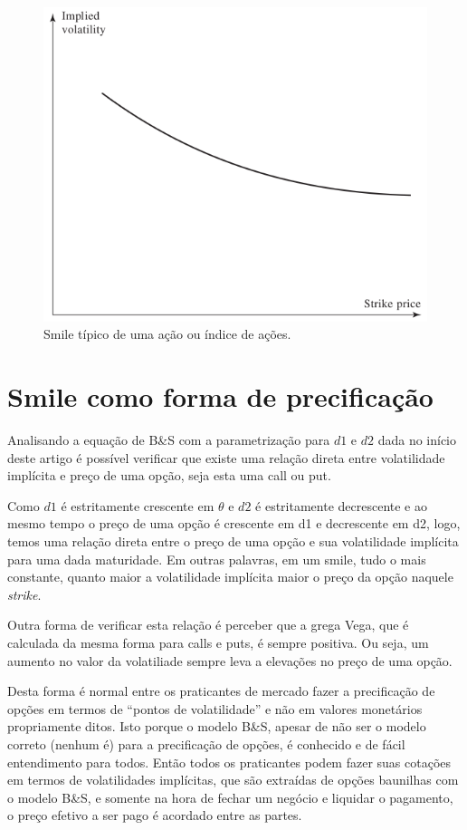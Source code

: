 \documentclass[]{book}
\begin{document}
\begin{figure}
\centering
\includegraphics{./images/smile_equities.png}
\caption{\label{fig:smile-equities}Smile típico de uma ação ou índice de
ações.}
\end{figure}

\section{Smile como forma de precificação}\label{smileprecificacao}

Analisando a equação de B\&S com a parametrização para \(d1\) e \(d2\)
dada no início deste artigo é possível verificar que existe uma relação
direta entre volatilidade implícita e preço de uma opção, seja esta uma
call ou put.

Como \(d1\) é estritamente crescente em \(\theta\) e \(d2\) é
estritamente decrescente e ao mesmo tempo o preço de uma opção é
crescente em d1 e decrescente em d2, logo, temos uma relação direta
entre o preço de uma opção e sua volatilidade implícita para uma dada
maturidade. Em outras palavras, em um smile, tudo o mais constante,
quanto maior a volatilidade implícita maior o preço da opção naquele
\emph{strike}.

Outra forma de verificar esta relação é perceber que a grega Vega, que é
calculada da mesma forma para calls e puts, é sempre positiva. Ou seja,
um aumento no valor da volatiliade sempre leva a elevações no preço de
uma opção.

Desta forma é normal entre os praticantes de mercado fazer a
precificação de opções em termos de ``pontos de volatilidade'' e não em
valores monetários propriamente ditos. Isto porque o modelo B\&S, apesar
de não ser o modelo correto (nenhum é) para a precificação de opções, é
conhecido e de fácil entendimento para todos. Então todos os praticantes
podem fazer suas cotações em termos de volatilidades implícitas, que são
extraídas de opções baunilhas com o modelo B\&S, e somente na hora de
fechar um negócio e liquidar o pagamento, o preço efetivo a ser pago é
acordado entre as partes.
\end{document}
